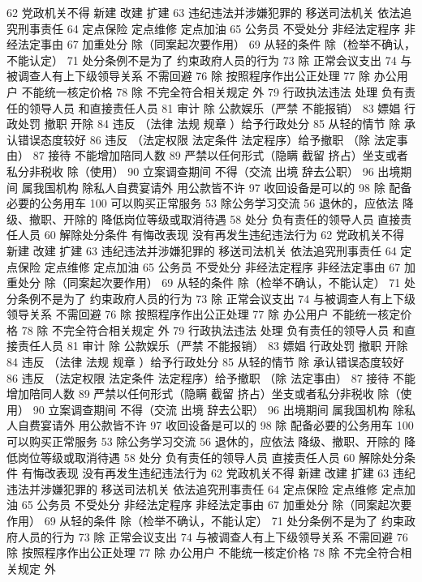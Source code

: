 \documentclass[11pt]{ctexart}
\begin{document}
62 党政机关不得
新建 改建 扩建
63 违纪违法并涉嫌犯罪的
移送司法机关
依法追究刑事责任
64 定点保险 定点维修 定点加油
65 公务员 不受处分
非经法定程序
非经法定事由
67 加重处分
除（同案起次要作用）
69 从轻的条件
除（检举不确认，不能认定）
71 处分条例不是为了
约束政府人员的行为
73 除 正常会议支出
74 与被调查人有上下级领导关系 不需回避
76 除 按照程序作出公正处理
77 除 办公用户
不能统一核定价格
78 除 不完全符合相关规定 外
79 行政执法违法 处理
负有责任的领导人员
和直接责任人员
81 审计
除 公款娱乐（严禁 不能报销）
83 嫖娼 行政处罚
撤职 开除
84 违反 （法律 法规 规章 ）给予行政处分
85 从轻的情节
除 承认错误态度较好
86 违反 （法定权限 法定条件 法定程序）给予撤职
（除 法定事由）
87 接待 不能增加陪同人数
89 严禁以任何形式（隐瞒 截留 挤占）坐支或者私分非税收
除（使用）
90 立案调查期间 不得（交流 出境 辞去公职）
96 出境期间 属我国机构 除私人自费宴请外 用公款皆不许
97 收回设备是可以的
98 除 配备必要的公务用车
100 可以购买正常服务
53 除公务学习交流
56 退休的，应依法
降级、撤职、开除的 降低岗位等级或取消待遇
58 处分
负有责任的领导人员
直接责任人员
60 解除处分条件
有悔改表现
没有再发生违纪违法行为
62 党政机关不得
新建 改建 扩建
63 违纪违法并涉嫌犯罪的
移送司法机关
依法追究刑事责任
64 定点保险 定点维修 定点加油
65 公务员 不受处分
非经法定程序
非经法定事由
67 加重处分
除（同案起次要作用）
69 从轻的条件
除（检举不确认，不能认定）
71 处分条例不是为了
约束政府人员的行为
73 除 正常会议支出
74 与被调查人有上下级领导关系 不需回避
76 除 按照程序作出公正处理
77 除 办公用户
不能统一核定价格
78 除 不完全符合相关规定 外
79 行政执法违法 处理
负有责任的领导人员
和直接责任人员
81 审计
除 公款娱乐（严禁 不能报销）
83 嫖娼 行政处罚
撤职 开除
84 违反 （法律 法规 规章 ）给予行政处分
85 从轻的情节
除 承认错误态度较好
86 违反 （法定权限 法定条件 法定程序）给予撤职
（除 法定事由）
87 接待 不能增加陪同人数
89 严禁以任何形式（隐瞒 截留 挤占）坐支或者私分非税收
除（使用）
90 立案调查期间 不得（交流 出境 辞去公职）
96 出境期间 属我国机构 除私人自费宴请外 用公款皆不许
97 收回设备是可以的
98 除 配备必要的公务用车
100 可以购买正常服务
53 除公务学习交流
56 退休的，应依法
降级、撤职、开除的 降低岗位等级或取消待遇
58 处分
负有责任的领导人员
直接责任人员
60 解除处分条件
有悔改表现
没有再发生违纪违法行为
62 党政机关不得
新建 改建 扩建
63 违纪违法并涉嫌犯罪的
移送司法机关
依法追究刑事责任
64 定点保险 定点维修 定点加油
65 公务员 不受处分
非经法定程序
非经法定事由
67 加重处分
除（同案起次要作用）
69 从轻的条件
除（检举不确认，不能认定）
71 处分条例不是为了
约束政府人员的行为
73 除 正常会议支出
74 与被调查人有上下级领导关系 不需回避
76 除 按照程序作出公正处理
77 除 办公用户
不能统一核定价格
78 除 不完全符合相关规定 外
\end{document}
